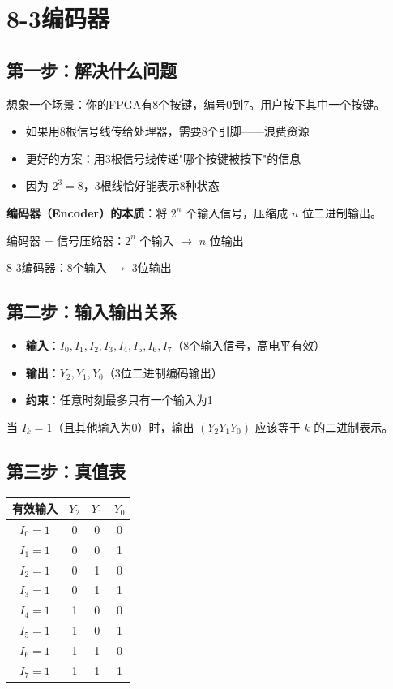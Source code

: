 \chapter{8-3编码器}

\section{第一步：解决什么问题}

想象一个场景：你的FPGA有8个按键，编号0到7。用户按下其中一个按键。

\begin{itemize}
  \item 如果用8根信号线传给处理器，需要8个引脚——浪费资源
  \item 更好的方案：用3根信号线传递"哪个按键被按下"的信息
  \item 因为 $2^3 = 8$，3根线恰好能表示8种状态
\end{itemize}

\textbf{编码器（Encoder）的本质}：将 $2^n$ 个输入信号，压缩成 $n$ 位二进制输出。

\begin{keypoint}[编码器的本质]
编码器 = 信号压缩器：$2^n$ 个输入 $\to$ $n$ 位输出

8-3编码器：8个输入 $\to$ 3位输出
\end{keypoint}

\section{第二步：输入输出关系}

\begin{itemize}
  \item \textbf{输入}：$I_0, I_1, I_2, I_3, I_4, I_5, I_6, I_7$（8个输入信号，高电平有效）
  \item \textbf{输出}：$Y_2, Y_1, Y_0$（3位二进制编码输出）
  \item \textbf{约束}：任意时刻最多只有一个输入为1
\end{itemize}

当 $I_k = 1$（且其他输入为0）时，输出 $(Y_2 Y_1 Y_0)$ 应该等于 $k$ 的二进制表示。

\section{第三步：真值表}

\begin{center}
\begin{tabular}{|c|c|c|c|}
\hline
\textbf{有效输入} & $Y_2$ & $Y_1$ & $Y_0$ \\
\hline
$I_0 = 1$ & 0 & 0 & 0 \\
$I_1 = 1$ & 0 & 0 & 1 \\
$I_2 = 1$ & 0 & 1 & 0 \\
$I_3 = 1$ & 0 & 1 & 1 \\
$I_4 = 1$ & 1 & 0 & 0 \\
$I_5 = 1$ & 1 & 0 & 1 \\
$I_6 = 1$ & 1 & 1 & 0 \\
$I_7 = 1$ & 1 & 1 & 1 \\
\hline
\end{tabular}
\end{center}

